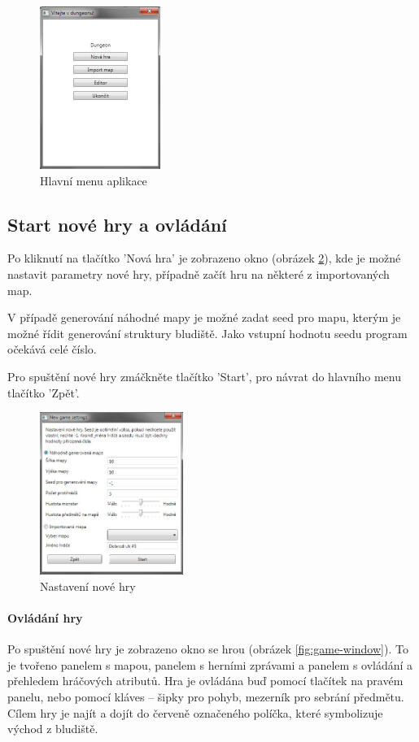 \documentclass[11pt,a4paper]{scrartcl}
\begin{document}
	\begin{figure}[H]
		\centering
		\includegraphics[height=200px]{menu-window}
		\caption{Hlavní menu aplikace}
		\label{fig:main-window}
	\end{figure}
	
	\subsection{Start nové hry a ovládání}
	Po kliknutí na tlačítko 'Nová hra' je zobrazeno okno (obrázek \ref{fig:new-game-sett}), kde je možné nastavit parametry nové hry, případně začít hru na některé z importovaných map. 
	
	V případě generování náhodné mapy je možné zadat seed pro mapu, kterým je možné řídit generování struktury bludiště. Jako vstupní hodnotu seedu program očekává celé číslo.
	
	Pro spuštění nové hry zmáčkněte tlačítko 'Start', pro návrat do hlavního menu tlačítko 'Zpět'.
	
	\begin{figure}[H]
		\centering
		\includegraphics[height=200px]{new-game-settings-window}
		\caption{Nastavení nové hry}
		\label{fig:new-game-sett}
	\end{figure}
	
	
	\paragraph{Ovládání hry}
	Po spuštění nové hry je zobrazeno okno se hrou (obrázek \ref{fig:game-window}). To je tvořeno panelem s mapou, panelem s herními zprávami a panelem s ovládání a přehledem hráčových atributů. Hra je ovládána buď pomocí tlačítek na pravém panelu, nebo pomocí kláves -- šipky pro pohyb, mezerník pro sebrání předmětu. Cílem hry je najít a dojít do červeně označeného políčka, které symbolizuje východ z bludiště.
	
\end{document}
